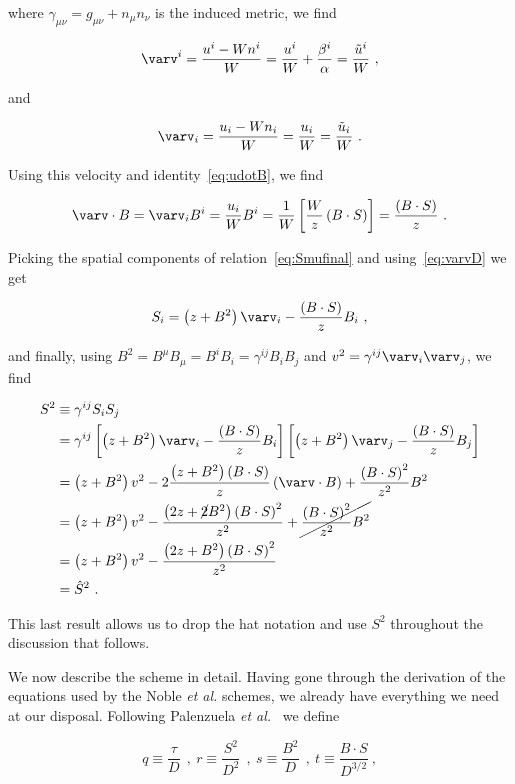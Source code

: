 \documentclass{article}
\newcommand{\etal}{\textit{et al.}\xspace}
\newcommand{\BdotS}{B\cdot S}
\newcommand{\vdotB}{\varv\cdot B}
\newcommand{\eq}[1]{
\begin{equation}
    #1
\end{equation}
}
\newcommand{\spl}[1]{
\eq{
\begin{split}
    #1
\end{split}
}
}
\begin{document}
\noindent where $\gamma_{\mu\nu} = g_{\mu\nu} + n_{\mu}n_{\nu}$ is the induced metric, we find

\eq{
  \varv^{i} = \frac{u^{i} - Wn^{i}}{W} = \frac{u^{i}}{W} + \frac{\beta^{i}}{\alpha} = \frac{\tilde{u}^{i}}{W}\ ,
}

\noindent and

\eq{
  \varv_{i} = \frac{u_{i} - Wn_{i}}{W} = \frac{u_{i}}{W} = \frac{\tilde{u}_{i}}{W}\ .\label{eq:varvD}
}

\noindent Using this velocity and identity~\eqref{eq:udotB}, we find

\eq{
  \vdotB = \varv_{i}B^{i} = \frac{u_{i}}{W}B^{i} = \frac{1}{W}\left[\frac{W}{z}\left(\BdotS\right)\right] = \frac{\left(\BdotS\right)}{z}\ .
}

\noindent Picking the spatial components of relation~\eqref{eq:Smufinal} and using~\eqref{eq:varvD} we get

\eq{
  S_{i} = \left(z + B^{2}\right)\varv_{i} - \frac{\left(\BdotS\right)}{z}B_{i}\ ,
}

\noindent and finally, using $B^{2} = B^{\mu}B_{\mu} = B^{i}B_{i} = \gamma^{ij}B_{i}B_{j}$ and $v^{2} = \gamma^{ij}\varv_{i}\varv_{j}$, we find

\spl{
  S^{2} &\equiv \gamma^{ij}S_{i}S_{j}\\
  &= \gamma^{ij}\left[\left(z + B^{2}\right)\varv_{i} - \frac{\left(\BdotS\right)}{z}B_{i}\right]\left[\left(z + B^{2}\right)\varv_{j} - \frac{\left(\BdotS\right)}{z}B_{j}\right]\\
  &= \left(z+B^{2}\right)v^{2} -2\frac{\left(z+B^{2}\right)\left(\BdotS\right)}{z}\left(\vdotB\right) + \frac{\left(\BdotS\right)^{2}}{z^{2}}B^{2}\\
  &= \left(z+B^{2}\right)v^{2} -\frac{\left(2z+\cancel{2}B^{2}\right)\left(\BdotS\right)^{2}}{z^{2}} + \cancel{\frac{\left(\BdotS\right)^{2}}{z^{2}}B^{2}}\\
  &= \left(z+B^{2}\right)v^{2} - \frac{\left(2z+B^{2}\right)\left(\BdotS\right)^{2}}{z^{2}}\\
  &= \hat{S}^{2}\ .
}

\noindent This last result allows us to drop the hat notation and use $S^{2}$ throughout the discussion that follows.

We now describe the scheme in detail. Having gone through the derivation of the equations used by the Noble \etal schemes, we already have everything we need at our disposal. Following Palenzuela \etal~\cite{neilsen2014magnetized} we define

\eq{
q \equiv \frac{\tau}{D}\ \ ,\
r \equiv \frac{S^{2}}{D^{2}}\ \ ,\
s \equiv \frac{B^{2}}{D}\ \ ,\
t \equiv \frac{\BdotS}{D^{3/2}}\ ,\label{eq:qrst}
}
\end{document}
